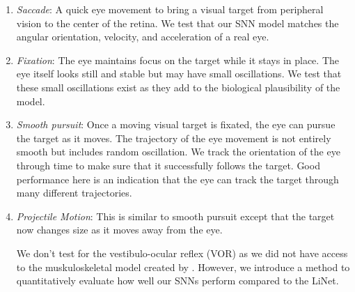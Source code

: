 \documentclass[../taasin.tex]{subfiles}
\begin{document}
\begin{enumerate}
    \item \textit{Saccade}: A quick eye movement to bring a visual target from peripheral vision to the center of the retina. We test that our SNN model matches the angular orientation, velocity, and acceleration of a real eye.
    \item \textit{Fixation}: The eye maintains focus on the target while it stays in place. The eye itself looks still and stable but may have small oscillations. We test that these small oscillations exist as they add to the biological plausibility of the model. 
    \item \textit{Smooth pursuit}: Once a moving visual target is fixated, the eye can pursue the target as it moves. The trajectory of the eye movement is not entirely smooth but includes random oscillation. We track the orientation of the eye through time to make sure that it successfully follows the target. Good performance here is an indication that the eye can track the target through many different trajectories.
    \item \textit{Projectile Motion}: This is similar to smooth pursuit except that the target now changes size as it moves away from the eye. 

We don't test for the vestibulo-ocular reflex (VOR) as we did not have access to the muskuloskeletal model created by \cite{Masaki}. However, we introduce a method to quantitatively evaluate how well our SNNs perform compared to the LiNet.

\end{enumerate}

\end{document}
